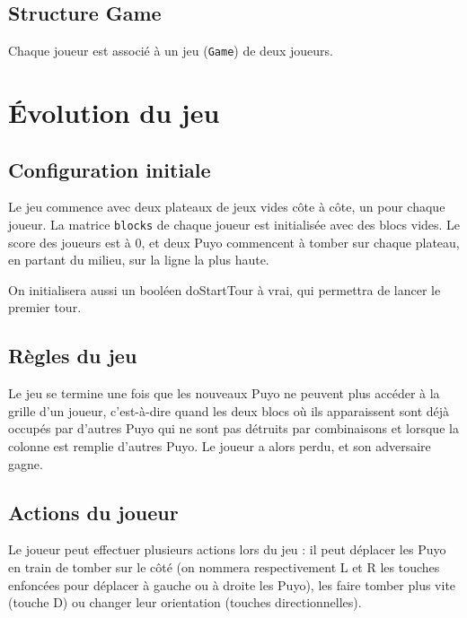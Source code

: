 \documentclass[11pt]{report}
\renewcommand{\tt}[1]{\texttt{#1}}
\begin{document}
\subsection{Structure Game}



Chaque joueur est associé à un jeu (\tt{Game}) de deux joueurs.
\\

\section{Évolution du jeu}

\subsection{Configuration initiale}



Le jeu commence avec deux plateaux de jeux vides côte à côte, un pour chaque joueur. La matrice \tt{blocks} de chaque joueur est initialisée avec des blocs vides. Le score des joueurs est à 0, et deux Puyo commencent à tomber sur chaque plateau, en partant du milieu, sur la ligne la plus haute. 

On initialisera aussi un booléen doStartTour à vrai, qui permettra de lancer le premier tour.
\\

\subsection{Règles du jeu}

Le jeu se termine une fois que les nouveaux Puyo ne peuvent plus accéder à la grille d'un joueur, c'est-à-dire quand les deux blocs où ils apparaissent sont déjà occupés par d'autres Puyo qui ne sont pas détruits par combinaisons et lorsque la colonne est remplie d'autres Puyo. Le joueur a alors perdu, et son adversaire gagne. 

\subsection{Actions du joueur}
Le joueur peut effectuer plusieurs actions lors du jeu : il peut déplacer les Puyo en train de tomber sur le côté (on nommera respectivement L et R les touches enfoncées pour déplacer à gauche ou à droite les Puyo), les faire tomber plus vite (touche D) ou changer leur orientation (touches directionnelles). 
\end{document}
